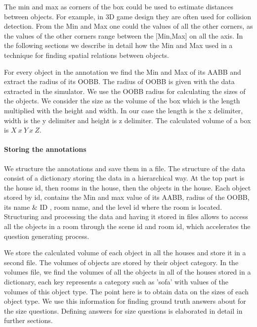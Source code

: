 The min and max as corners of the box could be used to estimate distances between objects. For example, in 3D game design they are often used for collision detection. From the Min and Max one could the values of all the other corners, as the values of the other corners range between the [Min,Max] on all the axis. In the following sections we describe in detail how the Min and Max used in a technique for finding spatial relations between objects. 

For every object in the annotation we find the Min and Max of its AABB and extract the radius of its OOBB. The radius of OOBB is given with the data extracted in the simulator. We use the OOBB radius for calculating the sizes of the objects. We consider the size as the volume of the box which is the length multiplied with the height and width. In our case the length is the x delimiter, width is the y delimiter and height is z delimiter. The calculated volume of a box is \begin{math} X\ x\ Y\ x\ Z \end{math}. 

\paragraph{Storing the annotations}

We structure the annotations and save them in a file. The structure of the data consist of a dictionary storing the data in a hierarchical way. At the top part is the house id, then rooms in the house, then the objects in the house. Each object stored by id, contains the Min and max value of its AABB, radius of the OOBB, its name \& ID , room name, and the level id where the room is located. Structuring and processing the data and having it stored in files allows to access all the objects in a room through the scene id and room id, which accelerates the question generating process.  

We store the calculated volume of each object in all the houses and store it in a second file. The volumes of objects are stored by their object category. In the volumes file, we find the volumes of all the objects in all of the houses stored in a dictionary, each key represents a category such as 'sofa' with values of the volumes of this object type. The point here is to obtain data on the sizes of each object type. We use this information for finding ground truth answers about for the size questions. Defining answers for size questions is elaborated in detail in further sections. 
 

